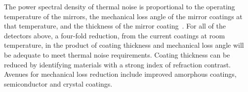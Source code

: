 
The power spectral density of thermal noise is proportional to the operating temperature of the mirrors, the mechanical loss angle of the mirror coatings at that temperature, and the thickness of the mirror coating~\cite{levin1998internal}. 
For all of the detectors above, a four-fold reduction, from the current coatings at room temperature, in the product of coating thickness and mechanical loss angle will be adequate to meet thermal noise requirements. Coating thickness can be reduced by identifying materials with a strong index of refraction contrast. Avenues for mechanical loss reduction include improved amorphous coatings, semiconductor and crystal coatings.





